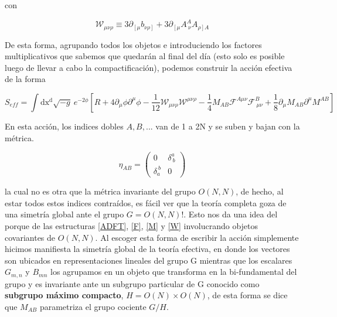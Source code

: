 \documentclass{article}
\numberwithin{equation}{section}
\begin{document}
con

\begin{equation}\label{W}
\mathcal{W}_{\mu \nu \rho} \equiv 3\partial_{\left[\mu\right.} b_{\left.\nu \rho\right]} + 3\partial_{\left[\mu\right.}A^A_{\ \nu}A_{\left.\rho\right] A}
\end{equation}

De esta forma, agrupando todos los objetos e introduciendo los factores multiplicativos que sabemos que quedarán al final del día (esto solo es posible luego de llevar a cabo la compactificación), podemos construir la acción efectiva de la forma


\begin{equation}\label{S_compact}
S_{eff}=\int\mathrm{dx^d} \sqrt{-g} \ e^{-2\phi}\left[R + 4 \partial_{\mu}\phi\partial^{\mu} \phi - \frac{1}{12} \mathcal{W}_{\mu \nu \rho} \mathcal{W}^{\mu \nu \rho} -\frac{1}{4} M_{A B} \mathcal{F}^{A \mu \nu} \mathcal{F}^B_{\ \mu \nu} + \frac{1}{8} \partial_{\mu} M_{A B} \partial^{\mu} M^{A B}\right] 
\end{equation}


En esta acción, los indices dobles $ A,B,... $ van de 1 a 2N y se suben y bajan con la métrica.

\begin{equation}\label{eta}
\eta_{A B} = \begin{pmatrix}
0 & \delta^a_{\ b}\\
\delta_a^{\ b} & 0
\end{pmatrix}
\end{equation}

la cual no es otra que la métrica invariante del grupo $ O(N,N) $, de hecho, al estar todos estos indices contraídos, es fácil ver que la teoría completa goza de una simetría global ante el grupo $ G= O(N,N) $!. Esto nos da una idea del porque de las estructuras \ref{ADFT}, \ref{F}, \ref{M} y \ref{W} involucrando objetos covariantes de $ O(N,N) $. Al escoger esta forma de escribir la acción simplemente hicimos manifiesta la simetría global de la teoría efectiva, en donde los vectores son ubicados en representaciones lineales del grupo G mientras que los escalares $ G_{m,n} $ y $ B_{m n} $ los agrupamos en un objeto que transforma en la bi-fundamental del grupo y es invariante ante un subgrupo particular de G conocido como \textbf{subgrupo máximo compacto}, $ H= O(N) \times O(N) $, de esta forma se dice que $ M_{A B} $ parametriza el grupo cociente $ G/H $.\\
\end{document}
